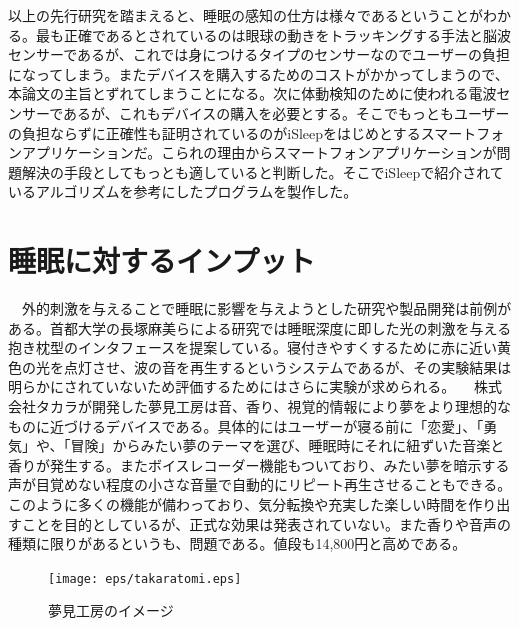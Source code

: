 以上の先行研究を踏まえると、睡眠の感知の仕方は様々であるということがわかる。最も正確であるとされているのは眼球の動きをトラッキングする手法と脳波センサーであるが、これでは身につけるタイプのセンサーなのでユーザーの負担になってしまう。またデバイスを購入するためのコストがかかってしまうので、本論文の主旨とずれてしまうことになる。次に体動検知のために使われる電波センサーであるが、これもデバイスの購入を必要とする。そこでもっともユーザーの負担ならずに正確性も証明されているのがiSleepをはじめとするスマートフォンアプリケーションだ。こられの理由からスマートフォンアプリケーションが問題解決の手段としてもっとも適していると判断した。そこでiSleepで紹介されているアルゴリズムを参考にしたプログラムを製作した。

\section{睡眠に対するインプット}
　外的刺激を与えることで睡眠に影響を与えようとした研究や製品開発は前例がある。首都大学の長塚麻美らによる研究では睡眠深度に即した光の刺激を与える抱き枕型のインタフェースを提案している\cite{sleepSheep}。寝付きやすくするために赤に近い黄色の光を点灯させ、波の音を再生するというシステムであるが、その実験結果は明らかにされていないため評価するためにはさらに実験が求められる。
　株式会社タカラが開発した夢見工房は音、香り、視覚的情報により夢をより理想的なものに近づけるデバイスである。具体的にはユーザーが寝る前に「恋愛」、「勇気」や、「冒険」からみたい夢のテーマを選び、睡眠時にそれに紐ずいた音楽と香りが発生する。またボイスレコーダー機能もついており、みたい夢を暗示する声が目覚めない程度の小さな音量で自動的にリピート再生させることもできる。 \cite{takaratomi}このように多くの機能が備わっており、気分転換や充実した楽しい時間を作り出すことを目的としているが、正式な効果は発表されていない。また香りや音声の種類に限りがあるというも、問題である。値段も14,800円と高めである。
\begin{figure}[htbp]
\begin{center}
\texttt{[image: eps/takaratomi.eps]}
\caption{夢見工房のイメージ}
\label{takaratomi}
\end{center}
\end{figure}

